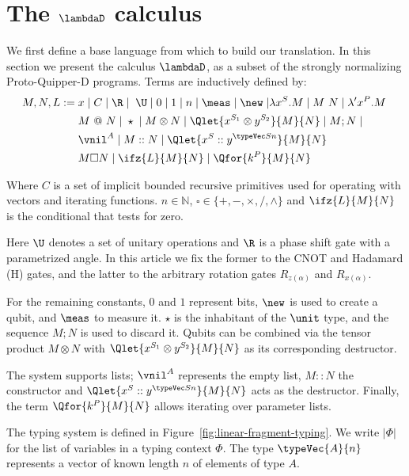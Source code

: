 \section{The \texorpdfstring{$\lambdaD$}{lambda sub D} calculus}%
\label{sec:fragment}

We first define a base language from which to build our translation. In this section we present the calculus $\lambdaD$, as a subset of the strongly normalizing Proto-Quipper-D programs. Terms are inductively defined by:
\begin{align*}
    M, N, L :=\; & x \;|\; C \;|\; \R \;|\; \; \U \;|\; 0 \;|\; 1 \;|\; n \;|\; \meas \;|\; \new \;|
            \lambda x^S. M \;|\; M \ N \;|\; \lambda' x^P. M \;\\
        & M\ @\ N \;|\;\star \;|\; M \otimes N \;|\; \Qlet{x^{S_1} \otimes y^{S_2}}{M}{N} \;|\;M;N \;|\; \\
        & \vnil^A \;|\; M :: N \;|\; \Qlet{x^S :: y^{\typeVec S n}}{M}{N} \\
        & M \square N \;|\; \ifz{L}{M}{N} \;|\; \Qfor{k^P}{M}{N}
\end{align*}

Where $C$ is a set of implicit bounded recursive primitives used for operating
with vectors and iterating functions. $n\in\mathbb{N}$, $\square\in\{+, -,
\times, / , \wedge\}$ and $\ifz{L}{M}{N}$ is the conditional that tests for
zero.

Here $\U$ denotes a set of unitary operations and $\R$ is a phase shift gate
with a parametrized angle. In this article we fix the former to the CNOT and
Hadamard (H) gates, and the latter to the arbitrary rotation gates
$R_{z(\alpha)}$ and $R_{x(\alpha)}$.

For the remaining constants, $0$ and $1$ represent bits, $\new$ is used to
create a qubit, and $\meas$ to measure it. $\star$ is the inhabitant of the
$\unit$ type, and the sequence $M;N$ is used to discard it. Qubits can be
combined via the tensor product $M\otimes N$ with $\Qlet{x^{S_1} \otimes
y^{S_2}}{M}{N}$ as its corresponding destructor.
 
The system supports lists; $\vnil^A$ represents the empty list, $M::N$ the
constructor and $\Qlet{x^S :: y^{\typeVec S n}}{M}{N}$ acts as the destructor. 
Finally, the term $\Qfor{k^P}{M}{N}$ allows iterating over parameter lists.

The typing system is defined in Figure~\ref {fig:linear-fragment-typing}. We
write $|\Phi|$ for the list of variables in a typing context $\Phi$. The type
$\typeVec{A}{n}$ represents a vector of known length $n$ of elements of type $A$.

